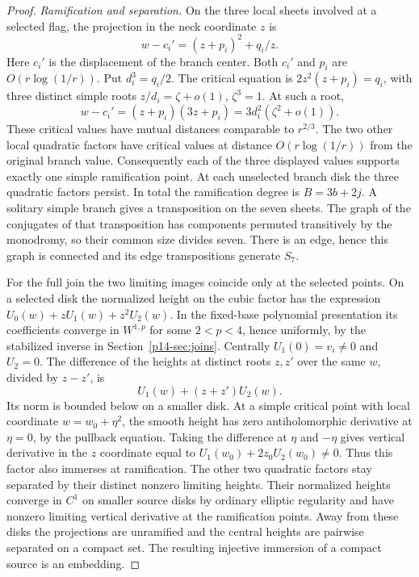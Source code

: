 \begin{proof}
\emph{Ramification and separation.}
On the three local sheets involved at a selected flag, the projection
in the neck coordinate $z$ is
\[
              w-c_i'=(z+p_i)^2+q_i/z .
\]
Here $c_i'$ is the displacement of the branch center.
Both $c_i'$ and $p_i$ are $O(r\log(1/r))$. Put $d_i^3=q_i/2$.
The critical equation is $2z^2(z+p_i)=q_i$, with three distinct
simple roots $z/d_i=\zeta+o(1)$, $\zeta^3=1$. At such a root,
\[
        w-c_i'=(z+p_i)(3z+p_i)=3d_i^2(\zeta^2+o(1)).
\]
These critical values have mutual distances comparable to $r^{2/3}$.
The two other local quadratic factors have critical values at
distance $O(r\log(1/r))$ from the original branch value. Consequently
each of the three displayed values supports exactly one simple
ramification point. At each unselected branch disk the three
quadratic factors persist. In total the ramification degree is
$B=3b+2j$. A solitary simple branch gives a transposition on the
seven sheets. The graph of the conjugates of that transposition has
components permuted transitively by the monodromy, so their common
size divides seven. There is an edge, hence this graph is connected
and its edge transpositions generate $S_7$.

For the full join the two limiting images coincide only at the
selected points. On a selected disk the normalized height on the
cubic factor has the expression $U_0(w)+zU_1(w)+z^2U_2(w)$. In the
fixed-base polynomial presentation its coefficients converge in
$W^{1,p}$ for some $2<p<4$, hence uniformly, by the stabilized
inverse in Section~\ref{p14-sec:joins}. Centrally $U_1(0)=v_i\ne0$ and
$U_2=0$. The difference of the heights at distinct roots $z,z'$
over the same $w$, divided by $z-z'$, is
\[
                          U_1(w)+(z+z')U_2(w).
\]
Its norm is bounded below on a smaller disk. At a simple critical
point with local coordinate $w=w_0+\eta^2$, the smooth height has
zero antiholomorphic derivative at $\eta=0$, by the pullback
equation. Taking the difference at $\eta$ and $-\eta$ gives vertical
derivative in the $z$ coordinate equal to
$U_1(w_0)+2z_0U_2(w_0)\ne0$. Thus this factor also immerses at
ramification. The other two quadratic factors stay separated by
their distinct nonzero limiting heights. Their normalized heights
converge in $C^1$ on smaller source disks by ordinary elliptic
regularity and have nonzero limiting vertical derivative at the
ramification points. Away from these disks the projections are
unramified and the central heights are pairwise separated on a
compact set. The resulting injective immersion of a compact source is
an embedding.


\end{proof}
